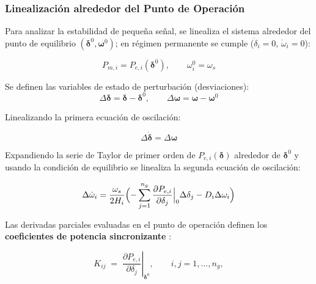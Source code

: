 
\subsubsection{Linealización alrededor del Punto de Operación}

Para analizar la estabilidad de pequeña señal, se linealiza el sistema alrededor del punto
de equilibrio $(\boldsymbol{\delta}^0, \boldsymbol{\omega}^0)$; en régimen permanente se 
cumple ($\dot{\delta}_i = 0$, $\dot{\omega}_i = 0$):

\begin{equation}
    P_{m,i} = P_{e,i}(\boldsymbol{\delta}^0), \qquad \omega_i^0 = \omega_s
\end{equation}

Se definen las variables de estado de perturbación (desviaciones):
\begin{equation}
    \Delta\boldsymbol{\delta} = \boldsymbol{\delta} - \boldsymbol{\delta}^0, \qquad
    \Delta\boldsymbol{\omega} = \boldsymbol{\omega} - \boldsymbol{\omega}^0
\end{equation}


Linealizando la primera ecuación de oscilación:

\begin{equation}
    \Delta\dot{\boldsymbol{\delta}} = \Delta\boldsymbol{\omega}
\end{equation}

Expandiendo la serie de Taylor de primer orden de $P_{e,i}(\boldsymbol{\delta})$ alrededor 
de $\boldsymbol{\delta}^0$ y usando la condición de equilibrio se linealiza la segunda 
ecuación de oscilación:

\begin{equation}
    \Delta\dot{\omega}_i = \frac{\omega_s}{2H_i}\Bigl(-\sum_{j=1}^{n_g} 
    \frac{\partial P_{e,i}}{\partial \delta_j}\Big|_0 \Delta\delta_j - D_i \Delta\omega_i\Bigr)
\end{equation}

Las derivadas parciales evaluadas en el punto de operación definen los
\textbf{coeficientes de potencia sincronizante} \cite{kundur1994}:

\begin{equation}
    K_{ij} \;=\; \left.\frac{\partial P_{e,i}}{\partial \delta_j}\right|_{\boldsymbol{\delta}^0},
    \qquad i,j = 1,\ldots,n_g,
    \label{eq:Kij}
\end{equation}

